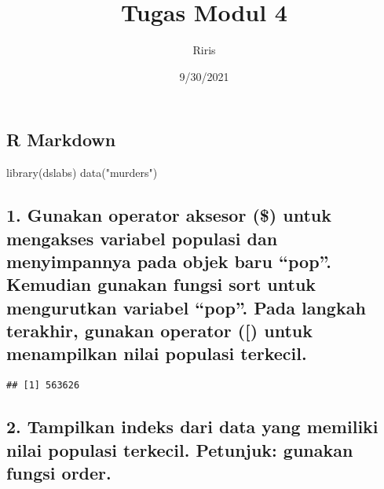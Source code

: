 \documentclass[
]{article}
\title{Tugas Modul 4}
\author{Riris}
\date{9/30/2021}
\newenvironment{Shaded}{\begin{snugshade}}{\end{snugshade}}
\newcommand{\DecValTok}[1]{\textcolor[rgb]{0.00,0.00,0.81}{#1}}
\newcommand{\FunctionTok}[1]{\textcolor[rgb]{0.00,0.00,0.00}{#1}}
\newcommand{\NormalTok}[1]{#1}
\newcommand{\OtherTok}[1]{\textcolor[rgb]{0.56,0.35,0.01}{#1}}
\newcommand{\SpecialCharTok}[1]{\textcolor[rgb]{0.00,0.00,0.00}{#1}}
\newcommand{\StringTok}[1]{\textcolor[rgb]{0.31,0.60,0.02}{#1}}
\begin{document}
\maketitle

\hypertarget{r-markdown}{%
\subsection{R Markdown}\label{r-markdown}}

\begin{Shaded}
\begin{Highlighting}[]
\FunctionTok{library}\NormalTok{(dslabs)}
\FunctionTok{data}\NormalTok{(}\StringTok{"murders"}\NormalTok{)}
\end{Highlighting}
\end{Shaded}

\hypertarget{gunakan-operator-aksesor-untuk-mengakses-variabel-populasi-dan-menyimpannya-pada-objek-baru-pop.-kemudian-gunakan-fungsi-sort-untuk-mengurutkan-variabel-pop.-pada-langkah-terakhir-gunakan-operator-untuk-menampilkan-nilai-populasi-terkecil.}{%
\subsection{1. Gunakan operator aksesor (\$) untuk mengakses variabel
populasi dan menyimpannya pada objek baru ``pop''. Kemudian gunakan
fungsi sort untuk mengurutkan variabel ``pop''. Pada langkah terakhir,
gunakan operator ({[}) untuk menampilkan nilai populasi
terkecil.}\label{gunakan-operator-aksesor-untuk-mengakses-variabel-populasi-dan-menyimpannya-pada-objek-baru-pop.-kemudian-gunakan-fungsi-sort-untuk-mengurutkan-variabel-pop.-pada-langkah-terakhir-gunakan-operator-untuk-menampilkan-nilai-populasi-terkecil.}}

\begin{Shaded}
\end{Shaded}

\begin{verbatim}
## [1] 563626
\end{verbatim}

\hypertarget{tampilkan-indeks-dari-data-yang-memiliki-nilai-populasi-terkecil.-petunjuk-gunakan-fungsi-order.}{%
\subsection{2. Tampilkan indeks dari data yang memiliki nilai populasi
terkecil. Petunjuk: gunakan fungsi
order.}\label{tampilkan-indeks-dari-data-yang-memiliki-nilai-populasi-terkecil.-petunjuk-gunakan-fungsi-order.}}
\end{document}

